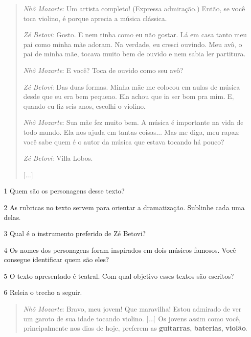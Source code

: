 \begin{quote}
\emph{Nhô Mozarte}: Um artista completo! (Expressa admiração.) Então, se
você toca violino, é porque aprecia a música clássica.

\emph{Zé Betovi}: Gosto. E nem tinha como eu não gostar. Lá em casa
tanto meu pai como minha mãe adoram. Na verdade, eu cresci ouvindo. Meu
avô, o pai de minha mãe, tocava muito bem de ouvido e nem sabia ler
partitura.

\emph{Nhô Mozarte}: E você? Toca de ouvido como seu avô?

\emph{Zé Betovi}: Das duas formas. Minha mãe me colocou em aulas de
música desde que eu era bem pequeno. Ela achou que ia ser bom pra mim.
E, quando eu fiz seis anos, escolhi o violino.

\emph{Nhô Mozarte}: Sua mãe fez muito bem. A música é importante na vida
de todo mundo. Ela nos ajuda em tantas coisas... Mas me diga, meu rapaz:
você sabe quem é o autor da música que estava tocando há pouco?

\emph{Zé Betovi}: Villa Lobos.

{[}...{]}

\end{quote}

\num{1} Quem são os personagens desse texto? 


\num{2} As rubricas no texto servem para orientar a dramatização. Sublinhe cada uma delas.
\bigskip

\num{3} Qual é o instrumento preferido de Zé Betovi? 


\num{4} Os nomes dos personagens foram inspirados em dois músicos famosos. Você
consegue identificar quem são eles? 


\num{5} O texto apresentado é teatral. Com qual objetivo esses textos são
escritos? 



\num{6} Releia o trecho a seguir.

\begin{quote}
\emph{Nhô Mozarte}: Bravo, meu jovem! Que maravilha! Estou admirado de
ver um garoto de sua idade tocando violino. {[}...{]} Os jovens assim
como você, principalmente nos dias de hoje, preferem as
\textbf{guitarras}, \textbf{baterias}, \textbf{violão}.
\end{quote}

